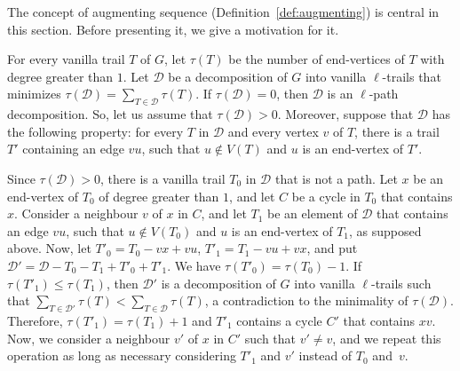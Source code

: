 \documentclass[12pt,reqno,a4paper]{amsart}
\newcommand{\verm}[1]{\textcolor{red}{#1}}
\newcommand{\D}{\mathcal{D}}
\newcommand{\B}{\mathcal{B}}
\begin{document}




The concept of augmenting sequence (Definition~\ref{def:augmenting})
is central in this section. Before presenting it, we give a motivation for it.

For every vanilla trail \(T\) of \(G\), let \(\tau(T)\)
be the number of end-vertices of \(T\) with degree greater than \(1\).  
Let \(\mathcal{D}\)
be a decomposition of $G$ into vanilla \(\ell\)-trails
that minimizes \(\tau(\D)=\sum_{T\in\mathcal{D}}\tau(T)\).
If \(\tau(\D) = 0\), then \(\D\)
is an \(\ell\)-path decomposition.
So, let us assume that \(\tau(\D) > 0\). Moreover, 
suppose that \(\mathcal{D}\) has the following property: for every \(T\) in \(\mathcal{D}\)
and every vertex \(v\) of \(T\), there is a trail \(T'\)
containing an edge \(vu\), such that \(u\notin V(T)\)
and \(u\) is an end-vertex of \(T'\). 

Since \(\tau(\D)>0\), there is a vanilla trail \(T_0\)
in \(\mathcal{D}\) that is not a path.  Let \(x\)
be an end-vertex of \(T_0\) of degree greater than \(1\),
and let \(C\) be a cycle in \(T_0\)
that contains \(x\). Consider a neighbour \(v\)
of \(x\) in \(C\), and let \(T_1\)
be an element of \(\mathcal{D}\)
that contains an edge \(vu\),
such that \(u\notin V(T_0)\) and \(u\)
is an end-vertex of \(T_1\), as supposed above. 
 Now, let \(T'_0 = T_0 - vx + vu\), \(T'_1 = T_1 -vu + vx\),
and put \(\mathcal{D}' = \mathcal{D} - T_0 -T_1 + T'_0+T'_1\).
We have \(\tau(T'_0) = \tau(T_0) - 1\).
If \(\tau(T'_1) \leq \tau(T_1)\), then \(\mathcal{D}'\)
is a decomposition of \(G\) into vanilla \(\ell\)-trails such that
\(\sum_{T\in\mathcal{D}'}\tau(T) < \sum_{T\in\mathcal{D}}\tau(T)\),
a contradiction to the minimality of \(\tau(\D)\).
Therefore, \(\tau(T'_1) = \tau(T_1) + 1\) and \(T'_1\)
contains a cycle \(C'\) that contains \(xv\).
Now, we consider a neighbour \(v'\) of \(x\) in \(C'\)
such that \(v' \neq v\), and we repeat this operation as long as 
necessary considering \(T'_1\) and \(v'\)
instead of \(T_0\) and~\(v\).
\end{document}
